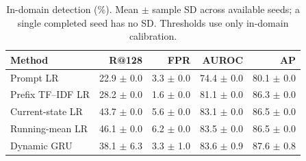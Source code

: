 \begin{table}[t]
\centering\footnotesize
\caption{In-domain detection (\%). Mean $\pm$ sample SD across available seeds; a single completed seed has no SD. Thresholds use only in-domain calibration.}\label{tab:main}
\begin{tabular}{lrrrr}\toprule
Method & R@128 & FPR & AUROC & AP \\
\midrule
Prompt LR & 22.9 $\pm$ 0.0 & 3.3 $\pm$ 0.0 & 74.4 $\pm$ 0.0 & 80.1 $\pm$ 0.0 \\
Prefix TF--IDF LR & 28.2 $\pm$ 0.0 & 1.6 $\pm$ 0.0 & 81.1 $\pm$ 0.0 & 86.3 $\pm$ 0.0 \\
Current-state LR & 43.7 $\pm$ 0.0 & 5.6 $\pm$ 0.0 & 83.1 $\pm$ 0.0 & 86.5 $\pm$ 0.0 \\
Running-mean LR & 46.1 $\pm$ 0.0 & 6.2 $\pm$ 0.0 & 83.5 $\pm$ 0.0 & 86.5 $\pm$ 0.0 \\
Dynamic GRU & 38.1 $\pm$ 6.3 & 3.3 $\pm$ 1.0 & 83.6 $\pm$ 0.9 & 87.6 $\pm$ 0.8 \\
\bottomrule\end{tabular}
\end{table}
